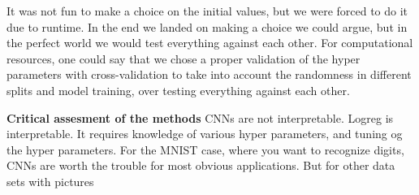 It was not fun to make a choice on the initial values, but we were forced to do it due to runtime. In the end we landed on making a choice we could argue, but in the perfect world we would test everything against each other. For computational resources, one could say that we chose a proper validation of the hyper parameters with cross-validation to take into account the randomness in different splits and model training, over testing everything against each other. 

\textbf{Critical assesment of the methods}
CNNs are not interpretable. Logreg is interpretable. It requires knowledge of various hyper parameters, and tuning og the hyper parameters. For the MNIST case, where you want to recognize digits, CNNs are worth the trouble for most obvious applications. But for other data sets with pictures

